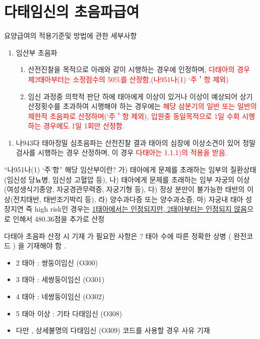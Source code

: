\section{다태임신의 초음파급여}
요양급여의 적용기준및 방법에 관한 세부사항\par
{}%
\begin{enumerate}[나.]\tightlist
\item 임산부 초음파
	\begin{enumerate}[1)]\tightlist
	\item 산전진찰을 목적으로 아래와 같이 시행하는 경우에 인정하며, \textcolor{red}{다태아의 경우 제2태아부터는 소정점수의 50\%를 산정함.(나951나(1) ‘주＇항 제외)}
	\item 임신 과정중 의학적 판단 하에 태아에게 이상이 있거나 이상이 예상되어 상기 산정횟수를 초과하여 시행해야 하는 경우에는 \textcolor{red}{해당 삼분기의 일반 또는 일반의 제한적 초음파로 산정하며(‘주＇항 제외), 입원중 동일목적으로 1일 수회 시행하는 경우에도 1일 1회만 산정함.}
	\end{enumerate}
\end{enumerate}	

\begin{enumerate}[다.]\tightlist
\item 나943다 태아정밀 심초음파는 산전진찰 결과 태아의 심장에 이상소견이 있어 정밀검사를 시행하는 경우 산정하며, 이 경우 \textcolor{red}{다태아는 1.1.1)의 적용을 받음.}
\end{enumerate}

“나951나(1) ‘주’항” 해당 임산부이란? 가) 태아에게 문제를 초래하는 임부의 질환상태(임신성 당뇨병, 임신성 고혈압 등), 나) 태아에게 문제를 초래하는 임부 자궁의 이상(여성생식기종양, 자궁경관무력증, 자궁기형 등), 다) 정상 분만이 불가능한 태반의 이상(전치태반, 태반조기박리 등), 라) 양수과다증 또는 양수과소증, 마) 자궁내 태아 성장지연 즉 high risk인 경우는 \uline{1태아에서는 인정되지만, 2태아부터는 인정되지 않음}으로 인해서 480.36점을 추가로 산정 
\prezi{\clearpage}
\begin{commentbox}{다태아 초음파 산정 시 기재 가 필요한 사항은 ?}
태아 수에 따른 정확한 상병 ( 완전코드 ) 을 기재해야 함 .
\begin{itemize}[-]\tightlist
\item 2 태아 : 쌍둥이임신 (O300)
\item 3 태아 : 세쌍둥이임신 (O301)
\item 4 태아 : 네쌍둥이임신 (O302)
\item 5 태아 이상 : 기타 다태임신 (O308)
\item 다만 , 상세불명의 다태임신 (O309) 코드를 사용할 경우 사유 기재
\end{itemize}
\end{commentbox}
\prezi{\clearpage}
